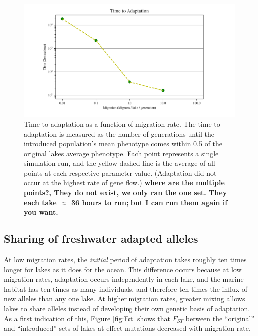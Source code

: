 \documentclass{article}
\begin{document}
\begin{figure}
	\begin{center}
  		\includegraphics{Final_Plots/Time_Adapt.pdf}
  		\caption{
		Time to adaptation as a function of migration rate.
        The time to adaptation is measured as the number of generations until
		the introduced population's mean phenotype 
        comes within 0.5 of the original lakes average phenotype. 
		Each point represents a single simulation run,
		and the yellow dashed line is the average of all points at each respective parameter value.
        (Adaptation did not occur at the highest rate of gene flow.)
        \textbf{where are the multiple points?, They do not exist, we only ran the one set. They each take $\approx$ 36 hours to run; but I can run them again if you want.} 
        } \label{fig:TimeToAdaptation}
	\end{center}
\end{figure}


\subsection*{Sharing of freshwater adapted alleles}

At low migration rates, the \emph{initial} period of adaptation
takes roughly ten times longer for lakes as it does for the ocean.
This difference occurs because at low migration rates, 
adaptation occurs independently in each lake,
and the marine habitat has ten times as many individuals,
and therefore ten times the influx of new alleles than any one lake. 
At higher migration rates, greater mixing
allows lakes to share alleles instead of developing their own genetic basis of adaptation. 
As a first indication of this, Figure \ref{fig:Fst} 
shows that $F_{ST}$ between the ``original'' and ``introduced'' sets of lakes 
at effect mutations decreased with migration rate.
\end{document}
